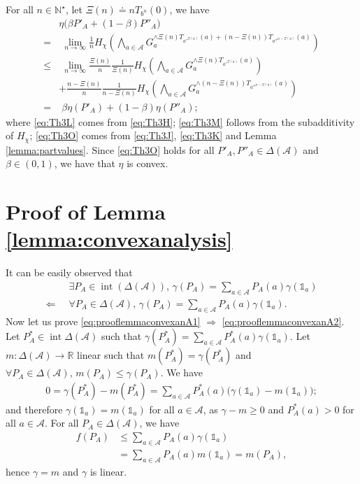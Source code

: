 \documentclass[conference,a4paper]{IEEEtran}
\DeclareMathOperator*{\interior}{int}
\begin{document}
For all $n \in \mathbb{N}^\star$, let $\Xi(n) \doteq n T_{b^n}(0)$, we have
\begin{align}
    & \eta\big(\beta P'_A + (1-\beta) P''_A\big) \\
    = & \; \lim_{n \rightarrow \infty} \frac{1}{n} H_\chi\left(\bigwedge_{a \in \mathcal{A}} G_a^{\wedge \Xi(n) T_{a'^{\Xi(n)}}(a) + (n-\Xi(n)) T_{a''^{n-\Xi(n)}}(a) } \right)\label{eq:Th3L} \\
    \leq & \; \lim_{n \rightarrow \infty} \frac{\Xi(n)}{n} \frac{1}{\Xi(n)} H_\chi\left(\bigwedge_{a \in \mathcal{A}} G_a^{\wedge \Xi(n) T_{a'^{\Xi(n)}}(a)}\right) \\
    & + \frac{n-\Xi(n)}{n} \frac{1}{n-\Xi(n)}  H_\chi\left(\bigwedge_{a \in \mathcal{A}} G_a^{\wedge (n-\Xi(n)) T_{a''^{n-\Xi(n)}}(a)}\right) \label{eq:Th3M}\\
    = & \; \beta \eta(P'_A) + (1-\beta)\eta(P''_A); \label{eq:Th3O}
\end{align}
where \eqref{eq:Th3L} comes from \eqref{eq:Th3H}; \eqref{eq:Th3M} follows from the subadditivity of $H_\chi$; \eqref{eq:Th3O} comes from \eqref{eq:Th3J}, \eqref{eq:Th3K} and Lemma \ref{lemma:partvalues}. Since \eqref{eq:Th3O} holds for all $P'_A, P''_A \in \Delta(\mathcal{A})$ and $\beta \in (0,1)$, we have that $\eta$ is convex.

\section{Proof of Lemma \ref{lemma:convexanalysis}} \label{section:prooflemmaconvexanalysis}
It can be easily observed that
\begin{align}
    & \exists P_A \in \interior(\Delta(\mathcal{A})), \, \gamma(P_A) = \sum_{a \in \mathcal{A}} P_A(a) \gamma(\mathds{1}_a) \label{eq:prooflemmaconvexanA1}\\
    \Longleftarrow \;\; & \forall P_A \in \Delta(\mathcal{A}), \, \gamma(P_A) = \sum_{a \in \mathcal{A}} P_A(a) \gamma(\mathds{1}_a). \label{eq:prooflemmaconvexanA2}
\end{align}
Now let us prove \eqref{eq:prooflemmaconvexanA1} $\Rightarrow$ \eqref{eq:prooflemmaconvexanA2}. Let $P^*_A \in \interior\Delta(\mathcal{A})$ such that $\gamma(P^*_A) = \sum_{a \in \mathcal{A}} P^*_A(a) \gamma(\mathds{1}_a)$. Let $m : \Delta(\mathcal{A}) \rightarrow \mathbb{R}$ linear such that $m(P^*_A) = \gamma(P^*_A)$ and $\forall P_A \in \Delta(\mathcal{A}),\, m(P_A) \leq \gamma(P_A)$. We have
\begin{align}
    0 = \gamma(P^*_A) - m(P^*_A) = \sum_{a \in \mathcal{A}} P^*_A(a) \big(\gamma(\mathds{1}_a) - m(\mathds{1}_a)\big);
\end{align}
and therefore $\gamma(\mathds{1}_a) = m(\mathds{1}_a)$ for all $a \in \mathcal{A}$, as $\gamma - m \geq 0$ and $P^*_A(a) > 0$ for all $a \in \mathcal{A}$. For all $P_A \in \Delta(\mathcal{A})$, we have
\begin{align}
    f(P_A) & \leq \sum_{a \in \mathcal{A}} P_A(a) \gamma(\mathds{1}_a) \\
    & = \sum_{a \in \mathcal{A}} P_A(a) m(\mathds{1}_a) = m(P_A),
\end{align}
hence $\gamma = m$ and $\gamma$ is linear.
\end{document}
